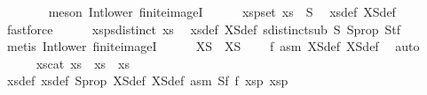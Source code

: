 \begin{isabellebody}
\ \ \ \ \ \ \isamarkupfalse%
\ {\isacharparenleft}{\kern0pt}meson\ Int{\isacharunderscore}{\kern0pt}lower{}\ finite{\isacharunderscore}{\kern0pt}imageI{\isacharparenright}{\kern0pt}\isanewline
\isanewline
\ \ \ \ \isamarkupfalse%
\ xs{}p{}{\isacharcolon}{\kern0pt}{\isachardoublequoteopen}set\ xs{}\ {\isasymsubseteq}\ S{}{\isachardoublequoteclose}\ \isamarkupfalse%
\ xs{}{\isacharunderscore}{\kern0pt}def\ XS{}{\isacharunderscore}{\kern0pt}def\ \isamarkupfalse%
\ fastforce\isanewline
\ \ \ \ \isamarkupfalse%
\ xs{}p{}{\isacharcolon}{\kern0pt}{\isachardoublequoteopen}sdistinct\ xs{}{\isachardoublequoteclose}\ \isamarkupfalse%
\ xs{}{\isacharunderscore}{\kern0pt}def\ XS{}{\isacharunderscore}{\kern0pt}def\ sdistinct{\isacharunderscore}{\kern0pt}sub\ S{}{\isacharparenleft}{\kern0pt}{}{\isacharparenright}{\kern0pt}\ S{}{\isacharunderscore}{\kern0pt}prop{\isacharparenleft}{\kern0pt}{}{\isacharparenright}{\kern0pt}\ S{}tf\isanewline
\ \ \ \ \ \ \isamarkupfalse%
\ {\isacharparenleft}{\kern0pt}metis\ Int{\isacharunderscore}{\kern0pt}lower{}\ finite{\isacharunderscore}{\kern0pt}imageI{\isacharparenright}{\kern0pt}\isanewline
\isanewline
\ \ \ \ \isamarkupfalse%
\ {\isachardoublequoteopen}XS{}\ {\isasyminter}\ XS{}\ {\isacharequal}{\kern0pt}\ {\isacharbraceleft}{\kern0pt}{\isacharbraceright}{\kern0pt}{\isachardoublequoteclose}\ \isamarkupfalse%
\ f{}{}{\isacharunderscore}{\kern0pt}{}\ asm\ XS{}{\isacharunderscore}{\kern0pt}def\ XS{}{\isacharunderscore}{\kern0pt}def\ \isamarkupfalse%
\ auto\isanewline
\ \ \ \ \isamarkupfalse%
\ xs{\isacharunderscore}{\kern0pt}cat{\isacharcolon}{\kern0pt}\ {\isachardoublequoteopen}xs\ {\isacharequal}{\kern0pt}\ xs{}\ {\isacharat}{\kern0pt}\ xs{}{\isachardoublequoteclose}\ \isanewline
\ \ \ \ \ \ \isamarkupfalse%
\ xs{}{\isacharunderscore}{\kern0pt}def\ xs{}{\isacharunderscore}{\kern0pt}def\ S{}{\isacharunderscore}{\kern0pt}prop{\isacharparenleft}{\kern0pt}{}{\isacharparenright}{\kern0pt}\ XS{}{\isacharunderscore}{\kern0pt}def\ XS{}{\isacharunderscore}{\kern0pt}def\ asm{\isacharparenleft}{\kern0pt}{}{\isacharparenright}{\kern0pt}\ S{}f\ f{}{}{\isacharunderscore}{\kern0pt}{}\ xs{}p{}\ xs{}p{}\isanewline

\end{isabellebody}
